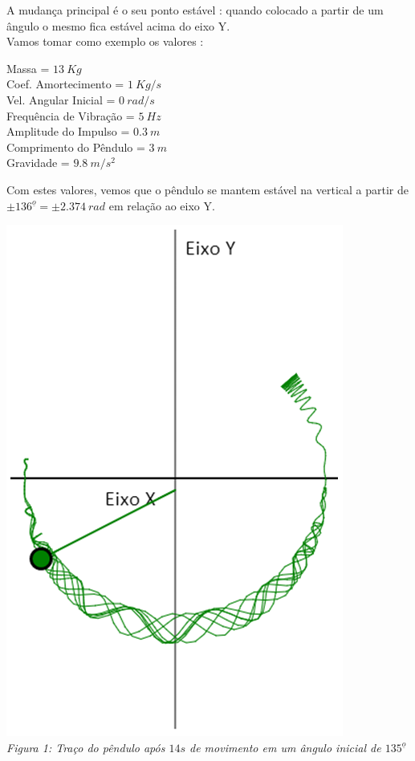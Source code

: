 \documentclass[13pt,a4paper]{report}
\begin{document}
A mudança principal é o seu ponto estável : quando colocado a partir de um ângulo o mesmo fica estável acima do eixo Y.
\\[1mm]

Vamos tomar como exemplo os valores :
\begin{center}
Massa = $ 13 \ Kg $
\\[1mm]Coef. Amortecimento = $ 1 \ Kg/s $
\\[1mm]Vel. Angular Inicial = $ 0 \ rad/s $
\\[1mm]Frequência de Vibração = $ 5 \ Hz $
\\[1mm]Amplitude do Impulso = $ 0.3 \ m $
\\[1mm]Comprimento do Pêndulo = $ 3 \ m $
\\[1mm]Gravidade = $ 9.8 \ m/s^{2} $
\end{center}
Com estes valores, vemos que o pêndulo se mantem estável 
na vertical a partir de $ \pm136^{\underline{o}} = \pm2.374 \ rad$ em relação ao eixo Y.

\begin{center}
\includegraphics[scale=0.5]{figuras/tracopenduloimpulsionado135.png}
\\
\textit{Figura 1: Traço do pêndulo após $14 s$ de movimento em um ângulo inicial
de $135^{\underline{o}}$ }
\end{center}
\clearpage
\end{document}
